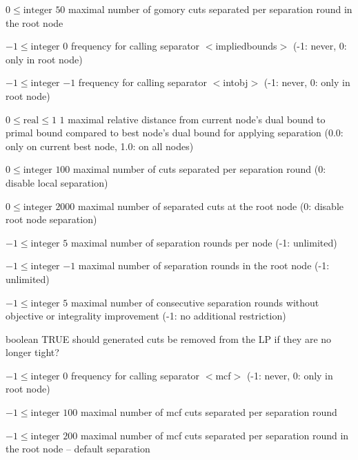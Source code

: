 %
{$0\leq\textrm{integer}$}%
{$50$}%
{maximal number of gomory cuts separated per separation round in the root node}%
{}

%
{$-1\leq\textrm{integer}$}%
{$0$}%
{frequency for calling separator $<$impliedbounds$>$ (-1: never, 0: only in root node)}%
{}

%
{$-1\leq\textrm{integer}$}%
{$-1$}%
{frequency for calling separator $<$intobj$>$ (-1: never, 0: only in root node)}%
{}

%
{$0\leq\textrm{real}\leq1$}%
{$1$}%
{maximal relative distance from current node's dual bound to primal bound compared to best node's dual bound for applying separation (0.0: only on current best node, 1.0: on all nodes)}%
{}

%
{$0\leq\textrm{integer}$}%
{$100$}%
{maximal number of cuts separated per separation round (0: disable local separation)}%
{}

%
{$0\leq\textrm{integer}$}%
{$2000$}%
{maximal number of separated cuts at the root node (0: disable root node separation)}%
{}

%
{$-1\leq\textrm{integer}$}%
{$5$}%
{maximal number of separation rounds per node (-1: unlimited)}%
{}

%
{$-1\leq\textrm{integer}$}%
{$-1$}%
{maximal number of separation rounds in the root node (-1: unlimited)}%
{}

%
{$-1\leq\textrm{integer}$}%
{$5$}%
{maximal number of consecutive separation rounds without objective or integrality improvement (-1: no additional restriction)}%
{}

%
{boolean}%
{TRUE}%
{should generated cuts be removed from the LP if they are no longer tight?}%
{}

%
{$-1\leq\textrm{integer}$}%
{$0$}%
{frequency for calling separator $<$mcf$>$ (-1: never, 0: only in root node)}%
{}

%
{$-1\leq\textrm{integer}$}%
{$100$}%
{maximal number of mcf cuts separated per separation round}%
{}

%
{$-1\leq\textrm{integer}$}%
{$200$}%
{maximal number of mcf cuts separated per separation round in the root node  -- default separation}%
{}

